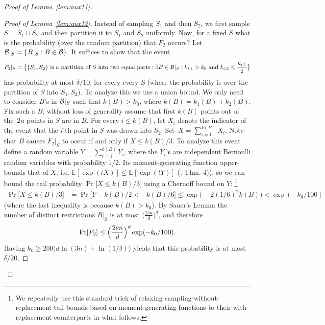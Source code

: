 \documentclass{article}
\newcommand{\B}{{\cal B}}
\newcommand{\evp}[2]{\mathbb{E}_{#2} \left[#1\right]} %
\newcommand{\samp}{S}
\newcommand{\comment}[3]{\marginpar{\textcolor{#2}{#1: #3}}}
\newcommand{\shay}[1]{\comment{Shay}{red}{#1}}
\newcommand{\yoav}[1]{\comment{Yoav}{blue}{#1}}
\begin{document}
\begin{proof}[Proof of Lemma~\ref{lem:aux11}]
\begin{proof}[Proof of Lemma~\ref{lem:aux12}]
Instead of sampling $\samp_1$ and then $\samp_2$,
we first sample $\samp=\samp_1\cup \samp_2$ and 
then partition it to $\samp_1$ and $\samp_2$ uniformly.
Now, for a fixed $\samp$ what is the probability (over the random partition)
that $F_2$ occurs?
Let $\B|_{\samp} = \{B|_{\samp} : B\in\B\}$.
It suffices to show that the event
\[F_2|_{\samp} = 
\bigl\{ \{S_1,S_2\}\text{ is a partition of $S$ into two equal parts} :
\exists {B\in\B|_{\samp}}:
  k_{i,1}>k_0 \mbox{ and } k_{i,2} \leq \frac{k_{i,1}}{2}
  \bigr\}
\]
has probability at most $\delta/10$, for every every $\samp$ 
(where the probability is over the partition of $\samp$ into $\samp_1,\samp_2$).
To analyze this we use a union bound. 
We only need to consider $B$'s in $\B|_{\samp}$ such that $k(B) > k_0$,
where $k(B) = k_{1}(B)+ k_{2}(B)$.
Fix such a $B$;
without loss of generality assume that
first $k(B)$ points out of the~$2n$
points in $S$ are in $B$. 
For every $i\leq k(B)$,
let $X_i$ denote the indicator of the event
that the $i$'th point in $S$ was drawn into $S_2$.
Set~$X=\sum_{i=1}^{k(B)}X_i$.
Note that $B$ causes $F_2|_{\samp}$ to occur if and only if $X\leq k(B)/3$.
To analyze this event define a random variable $Y=\sum_{i=1}^{k(B)}Y_i$,
where the $Y_i$'s are independent Bernoulli random variables with probability $1/2$. 
Its moment-generating function upper-bounds that of $X$, i.e. $\evp{\exp(tX)}{} \leq \evp{\exp(tY)}{}$ 
(\cite{H63}, Thm. 4)), 
so we can bound the tail probability $\Pr\bigl[X\leq k(B)/3\bigr]$ using a Chernoff bound on $Y$:
\footnote{We repeatedly use this standard trick of relaxing sampling-without-replacement tail bounds based on moment-generating functions to their with-replacement counterparts in what follows.} 
\yoav{Akshay, I can see how this argument works for a single ball $B$,
  but not how it would work for a uniform bound over a set of balls.}
\shay{Here we should refer to the statement that sampling without repetitions is more concentrated.}
\yoav{This comment by shay appears verbatim in three different
  places. Should all of them be there? (instead of uncommenting
  comments, change the newcommands that create them).}
\begin{align*}
\Pr\bigl[X\leq k(B)/3\bigr]
&=\Pr\bigl[Y- k(B)/2 < -k(B)/6\bigr]\leq
\exp\bigl(-2(1/6)^2k(B)\bigr) < \exp(-k_0/100)
\end{align*}
(where the last inequality is because $k(B) > k_0$).
By Sauer's Lemma
the number of distinct restrictions $B|_S$ is at most $\bigl(\frac{2en}{d}\bigr)^d$, and therefore 
\[\Pr[F_2]\leq \Bigl(\frac{2en}{d}\Bigr)^d\exp(-k_0/100).\]
Having $k_0\geq 200\bigl(d\ln(3n) + \ln(1/\delta) \bigr)$ yields
that this probability is at most $\delta/20$.
\end{proof}


\end{proof}
\end{document}
